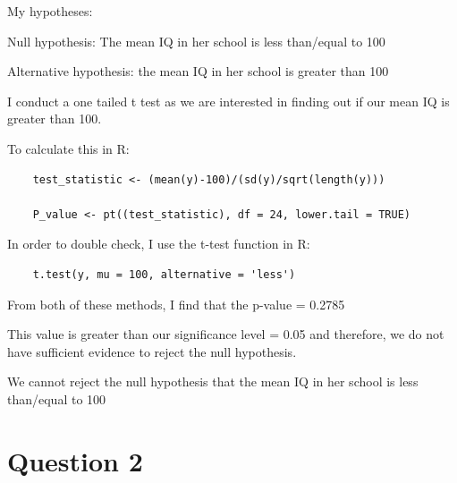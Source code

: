\documentclass{article}
\begin{document}
\noindent My hypotheses: 

Null hypothesis: The mean IQ in her school is less than/equal to 100


Alternative hypothesis: the mean IQ in her school is greater than 100

\vspace{0.3cm}
\noindent 
I conduct a one tailed t test as we are interested in finding out if our mean IQ is greater than 100. 

To calculate this in R:
\begin{verbatim}
    test_statistic <- (mean(y)-100)/(sd(y)/sqrt(length(y)))

    P_value <- pt((test_statistic), df = 24, lower.tail = TRUE)    
\end{verbatim}
In order to double check, I use the t-test function in R:
\begin{verbatim}
    t.test(y, mu = 100, alternative = 'less')
\end{verbatim}

From both of these methods, I find that the p-value = 0.2785

This value is greater than our significance level = 0.05 and therefore,
we do not have sufficient evidence to reject the null hypothesis.

We cannot reject the null hypothesis that the mean IQ in her school is less than/equal to 100

\pagebreak
\section{Question 2}
\end{document}
